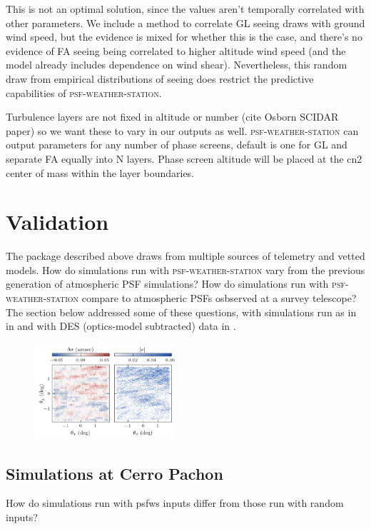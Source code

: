 \documentclass[twocolumn]{aastex631}
\newcommand{\psfws}{\textsc{psf-weather-station}\xspace}
\begin{document}
This is not an optimal solution, since the values aren't temporally correlated with other parameters. 
We include a method to correlate GL seeing draws with ground wind speed, but the evidence is mixed for whether this is the case, and there's no evidence of FA seeing being correlated to higher altitude wind speed (and the model already includes dependence on wind shear). 
Nevertheless, this random draw from empirical distributions of seeing does restrict the predictive capabilities of \psfws. 

Turbulence layers are not fixed in altitude or number (cite Osborn SCIDAR paper) so we want these to vary in our outputs as well.
\psfws can output parameters for any number of phase screens, default is one for GL and separate FA equally into N layers. 
Phase screen altitude will be placed at the cn2 center of mass within the layer boundaries.

\section{Validation} \label{sec:valid}
The package described above draws from multiple sources of telemetry and vetted models. 
How do simulations run with \psfws vary from the previous generation of atmospheric PSF simulations? 
How do simulations run with \psfws compare to atmospheric PSFs osbserved at a survey telescope?
The section below addressed some of these questions, with simulations run as in  in  and with DES (optics-model subtracted) data in .

\begin{figure}
\includegraphics[width=0.47\textwidth]{example_output.png}
\caption{
    \label{fig:output}
    }
\end{figure}

\subsection{Simulations at Cerro Pachon}\label{sec:imsimcompare}
How do simulations run with psfws inputs differ from those run with random inputs?
\end{document}
